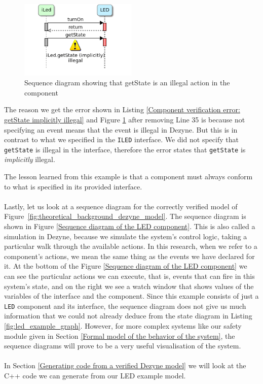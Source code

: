 \documentclass[12pt]{scrreprt}
\begin{document}
\begin{figure}[H]
    \centering
    \includegraphics[width=0.5\textwidth]{Figures/theoretical_background/getState_implicitly_illegal.png}
    \caption{Sequence diagram showing that getState is an illegal action in the component}
    \label{Sequence diagram showing that the component does not conform to the interface}
\end{figure}

The reason we get the error shown in Listing \ref{Component verification error: getState implicitly illegal} and Figure \ref{Sequence diagram showing that the component does not conform to the interface} after removing Line 35 is because not specifying an event means that the event is illegal in Dezyne. But this is in contrast to what we specified in the \texttt{ILED} interface. We did not specify that \texttt{getState} is illegal in the interface, therefore the error states that \texttt{getState} is \textit{implicitly} illegal.
\par
The lesson learned from this example is that a component must always conform to what is specified in its provided interface.
\\\\
Lastly, let us look at a sequence diagram for the correctly verified model of Figure~\ref{fig:theoretical_background_dezyne_model}. The sequence diagram is shown in Figure \ref{Sequence diagram of the LED component}. This is also called a simulation in Dezyne, because we simulate the system's control logic, taking a particular walk through the available actions. In this research, when we refer to a component's actions, we mean the same thing as the events we have declared for it. At the bottom of the Figure \ref{Sequence diagram of the LED component} we can see the particular actions we can execute, that is, events that can fire in this system's state, and on the right we see a watch window that shows values of the variables of the interface and the component. Since this example consists of just a \texttt{LED} component and its interface, the sequence diagram does not give us much information that we could not already deduce from the state diagram in Listing \ref{fig:led_example_graph}. However, for more complex systems like our safety module given in Section \ref{Formal model of the behavior of the system}, the sequence diagrams will prove to be a very useful visualisation of the system.
\\\\
In Section \ref{Generating code from a verified Dezyne model} we will look at the C++ code we can generate from our LED example model.
\end{document}
